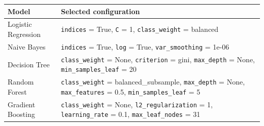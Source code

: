 \begin{tabular}{>{\raggedright\arraybackslash}l>{\raggedright\arraybackslash}p{11cm}}
\toprule
Model & Selected configuration \\
\midrule
Logistic Regression & \texttt{indices} = True, \texttt{C} = 1, \texttt{class\_weight} = balanced \\
Naive Bayes & \texttt{indices} = True, \texttt{log} = True, \texttt{var\_smoothing} = 1e-06 \\
Decision Tree & \texttt{class\_weight} = None, \texttt{criterion} = gini, \texttt{max\_depth} = None, \texttt{min\_samples\_leaf} = 20 \\
Random Forest & \texttt{class\_weight} = balanced\_subsample, \texttt{max\_depth} = None, \texttt{max\_features} = 0.5, \texttt{min\_samples\_leaf} = 5 \\
Gradient Boosting & \texttt{class\_weight} = None, \texttt{l2\_regularization} = 1, \texttt{learning\_rate} = 0.1, \texttt{max\_leaf\_nodes} = 31 \\
\bottomrule
\end{tabular}
